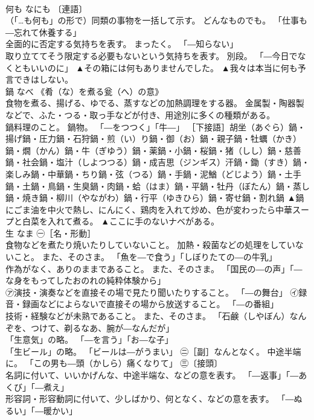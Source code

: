 \documentclass[8pt]{extreport}
\begin{document}
\begin{CJK}{UTF8}{min}
\\	何も	なにも	〔連語〕 
\\	（「…も何も」の形で）同類の事物を一括して示す。 どんなものでも。 「仕事も―忘れて休養する」 
\\	全面的に否定する気持ちを表す。 まったく。 「―知らない」 
\\	取り立ててそう限定する必要もないという気持ちを表す。 別段。 「―今日でなくともいいのに」	▲その箱には何もありませんでした。 ▲我々は本当に何も予言できはしない。
\\	鍋	なべ	《肴（な）を煮る瓮（へ）の意》 
\\	食物を煮る、揚げる、ゆでる、蒸すなどの加熱調理をする器。 金属製・陶器製などで、ふた・つる・取っ手などが付き、用途別に多くの種類がある。 
\\	鍋料理のこと。 鍋物。 「―をつつく」「牛―」 ［下接語］胡坐（あぐら）鍋・揚げ鍋・圧力鍋・石狩鍋・煎（い）り鍋・御（お）鍋・親子鍋・牡蠣（かき）鍋・燗（かん）鍋・牛（ぎゆう）鍋・薬鍋・小鍋・桜鍋・猪（しし）鍋・慈善鍋・社会鍋・塩汁（しよつつる）鍋・成吉思（ジンギス）汗鍋・鋤（すき）鍋・楽しみ鍋・中華鍋・ちり鍋・弦（つる）鍋・手鍋・泥鰌（どじよう）鍋・土手鍋・土鍋・鳥鍋・生臭鍋・肉鍋・蛤（はま）鍋・平鍋・牡丹（ぼたん）鍋・蒸し鍋・焼き鍋・柳川（やながわ）鍋・行平（ゆきひら）鍋・寄せ鍋・割れ鍋	▲鍋にごま油を中火で熱し、にんにく、鶏肉を入れて炒め、色が変わったら中華スープと白菜を入れて煮る。 ▲ここに手のないナベがある。
\\	生	なま	㊀［名・形動］ 
\\	食物などを煮たり焼いたりしていないこと。 加熱・殺菌などの処理をしていないこと。 また、そのさま。 「魚を―で食う」「しぼりたての―の牛乳」 
\\	作為がなく、ありのままであること。 また、そのさま。 「国民の―の声」「―な身をもってしたおのれの純粋体験から」 
\\	㋐演技・演奏などを直接その場で見たり聞いたりすること。 「―の舞台」 ㋑録音・録画などによらないで直接その場から放送すること。 「―の番組」 
\\	技術・経験などが未熟であること。 また、そのさま。 「石鹸（しやぼん）なんぞを、つけて、剃るなあ、腕が―なんだが」 
\\	「生意気」の略。 「―を言う」「お―な子」 
\\	「生ビール」の略。 「ビールは―がうまい」 ㊁［副］なんとなく。 中途半端に。 「この男も―頭（かしら）痛くなりて」 ㊂〔接頭〕 
\\	名詞に付いて、いいかげんな、中途半端な、などの意を表す。 「―返事」「―あくび」「―煮え」 
\\	形容詞・形容動詞に付いて、少しばかり、何となく、などの意を表す。 「―ぬるい」「―暖かい」 

\end{CJK}
\end{document}
